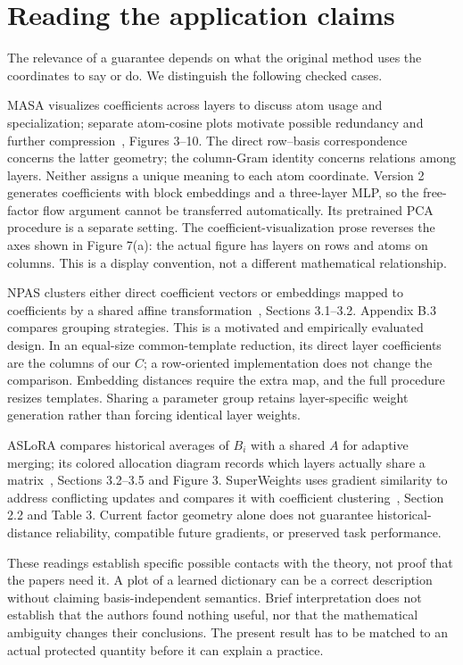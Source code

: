 \section{Reading the application claims}
The relevance of a guarantee depends on what the original method uses the coordinates to say or do. We distinguish the following checked cases.

MASA visualizes coefficients across layers to discuss atom usage and specialization; separate atom-cosine plots motivate possible redundancy and further compression~\cite{masa}, Figures 3--10. The direct row--basis correspondence concerns the latter geometry; the column-Gram identity concerns relations among layers. Neither assigns a unique meaning to each atom coordinate. Version 2 generates coefficients with block embeddings and a three-layer MLP, so the free-factor flow argument cannot be transferred automatically. Its pretrained PCA procedure is a separate setting. The coefficient-visualization prose reverses the axes shown in Figure 7(a): the actual figure has layers on rows and atoms on columns. This is a display convention, not a different mathematical relationship.

NPAS clusters either direct coefficient vectors or embeddings mapped to coefficients by a shared affine transformation~\cite{npas}, Sections 3.1--3.2. Appendix B.3 compares grouping strategies. This is a motivated and empirically evaluated design. In an equal-size common-template reduction, its direct layer coefficients are the columns of our $C$; a row-oriented implementation does not change the comparison. Embedding distances require the extra map, and the full procedure resizes templates. Sharing a parameter group retains layer-specific weight generation rather than forcing identical layer weights.

ASLoRA compares historical averages of $B_i$ with a shared $A$ for adaptive merging; its colored allocation diagram records which layers actually share a matrix~\cite{aslora}, Sections 3.2--3.5 and Figure 3. SuperWeights uses gradient similarity to address conflicting updates and compares it with coefficient clustering~\cite{sw}, Section 2.2 and Table 3. Current factor geometry alone does not guarantee historical-distance reliability, compatible future gradients, or preserved task performance.

These readings establish specific possible contacts with the theory, not proof that the papers need it. A plot of a learned dictionary can be a correct description without claiming basis-independent semantics. Brief interpretation does not establish that the authors found nothing useful, nor that the mathematical ambiguity changes their conclusions. The present result has to be matched to an actual protected quantity before it can explain a practice.


